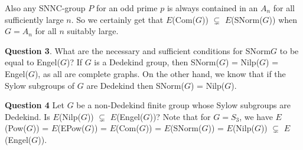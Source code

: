 Also any SNNC-group $P$ for an odd prime $p$ is always contained in an $A_n$ for all sufficiently large $n$. So we certainly get that $E$(Com($G$)) $\subsetneq$ $E$(SNorm($G$)) when $G = A_n$ for all $n$ suitably large.\\ \par 
{\bf Question 3}. What are the necessary and sufficient conditions for SNorm$G$ to be equal to Engel($G$)?  If $G$ is a Dedekind group, then SNorm($G$) = Nilp($G$) = Engel($G$), as all are complete graphs. On the other hand, we know that if the Sylow subgroups of $G$ are Dedekind then SNorm($G$) = Nilp($G$). \\ \par
{\bf Question 4} Let $G$ be a non-Dedekind finite group whose Sylow subgroups are Dedekind. Is $E$(Nilp($G$)) $\subsetneq$ $E$(Engel($G$))? Note that for $G = S_3$, we have $E$(Pow($G$)) = $E$(EPow($G$)) = $E$(Com($G$)) = $E$(SNorm($G$)) = $E$(Nilp($G$)) $\subsetneq$ $E$(Engel($G$)).



